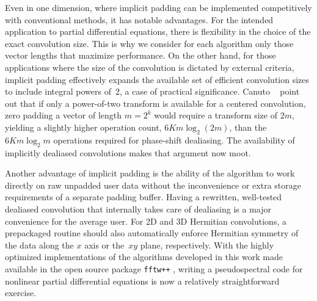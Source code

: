 \documentclass[final]{siamltex}
\begin{document}
Even in one dimension, where implicit padding can be implemented
competitively with conventional methods, it has notable advantages.
For the intended application to partial differential
equations, there is flexibility in the choice of the exact convolution
size. This is why we consider for each algorithm only those vector lengths
that maximize performance.
On the other hand, for those applications where the size of the convolution
is dictated by external criteria, implicit padding effectively expands the
available set of efficient convolution sizes to include integral powers
of~$2$, a case of practical significance.
Canuto \etal\ \cite[p.136]{Canuto06} point out that if only a
power-of-two transform is available for a centered convolution, zero
padding a vector of length $m=2^k$  would require a transform size of $2m$,
yielding a slightly higher operation count, $6Km\log_2(2m)$, than the $6K
m\log_2m$ operations required for phase-shift dealiasing. The availability
of implicitly dealiased convolutions makes that argument now moot.

Another advantage of implicit padding is the ability of the algorithm to
work directly on raw unpadded user data without the inconvenience or extra
storage requirements of a separate padding buffer. 
Having a rewritten, well-tested dealiased convolution that internally
takes care of dealiasing is a major convenience for the average user.
For 2D and 3D Hermitian convolutions, a prepackaged routine should also
automatically enforce Hermitian symmetry of the data along the $x$ axis or
the~$xy$ plane, respectively. With the highly optimized implementations of
the algorithms developed in this work made available in the open source
package {\tt fftw++} \cite{fftwpp}, writing a pseudospectral code for
nonlinear partial differential equations is now a relatively
straightforward exercise.



\end{document}
